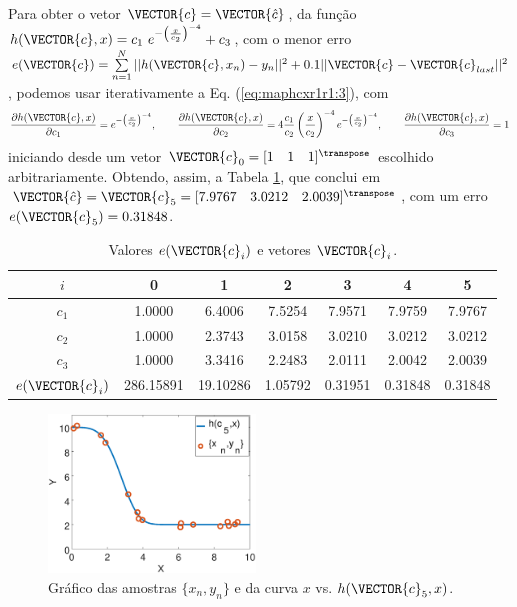 \begin{SolutionT}\label{sol:theo:maphcxr1r1}
Para obter  o vetor $\VECTOR{c}=\VECTOR{\hat{c}}$, da função $h(\VECTOR{c},x) = c_1~ e^{-\left(\frac{x}{c_2}\right)^{-4}}+c_3$,
com o menor erro $e(\VECTOR{c})=\sum\limits_{n=1}^{N} ||h(\VECTOR{c},x_n)-y_n||^2 +0.1 ||\VECTOR{c}-\VECTOR{c}_{last}||^2$,
podemos usar iterativamente a Eq. (\ref{eq:maphcxr1r1:3}), com 
\begin{equation}
\frac{\partial h(\VECTOR{c},x)}{\partial c_1} 
= e^{-\left(\frac{x}{c_2}\right)^{-4}},\qquad 
\frac{\partial h(\VECTOR{c},x)}{\partial c_2} 
= 4\frac{c_1}{c_2}\left(\frac{x}{c_2}\right)^{-4}e^{-\left(\frac{x}{c_2}\right)^{-4}}, \qquad 
\frac{\partial h(\VECTOR{c},x)}{\partial c_3} 
=1
\end{equation} 
iniciando desde um vetor $\VECTOR{c}_{0}=[1\quad 1\quad 1]^{\transpose}$ escolhido arbitrariamente.
Obtendo, assim, a Tabela \ref{table:theo:maphcxr1r1:ei}, que conclui em
$\VECTOR{\hat{c}}=\VECTOR{c}_{5}=[7.9767\quad 3.0212\quad 2.0039]^{\transpose}$,
com  um erro $e(\VECTOR{c}_{5})=0.31848$.


\begin{table}[h!]
\centering
\begin{tabular}{|c|c|c|c|c|c|c|} 
 \hline
$i$   & 0 & 1 & 2 & 3 & 4 & 5 \\ \hline
\hline
$c_1$ & 1.0000 & 6.4006 & 7.5254 & 7.9571 & 7.9759 & 7.9767 \\ \hline
$c_2$ & 1.0000 & 2.3743 & 3.0158 & 3.0210 & 3.0212 & 3.0212 \\ \hline
$c_3$ & 1.0000 & 3.3416 & 2.2483 & 2.0111 & 2.0042 & 2.0039 \\ \hline
\hline
$e(\VECTOR{c}_{i})$ & 286.15891 & 19.10286 & 1.05792 & 0.31951 & 0.31848 & 0.31848  \\ \hline
\end{tabular}
\caption{Valores $e(\VECTOR{c}_{i})$ e vetores $\VECTOR{c}_{i}$.}
\label{table:theo:maphcxr1r1:ei}
\end{table}

    \begin{figure}[!h]
        \centering
        \includegraphics[width=0.49\textwidth]{chapters/mapeamento/mfiles/mapeamentor1r1-nonlinear/minimizando_hx.eps}
        \caption{Gráfico das amostras $\{x_n,y_n\}$ e da curva $x$ vs. $h(\VECTOR{c}_5,x)$.}
        \label{fig:theo:maphcxr1r1:xnyn}
    \end{figure}

\end{SolutionT}


